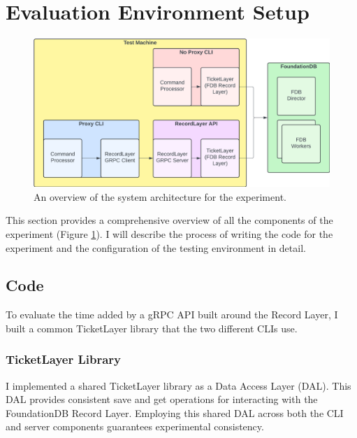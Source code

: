 \documentclass[sigconf]{acmart}
\begin{document}
\section{Evaluation Environment Setup}

\begin{figure}[t]
  \centering
  \includegraphics[width=\linewidth]{diag_system.png}
  \caption{An overview of the system architecture for the experiment.}
  \label{fig:diag_system}
\end{figure}

This section provides a comprehensive overview of all the components of the experiment (Figure \ref{fig:diag_system}). I will describe the process of writing the code for the experiment and the configuration of the testing environment in detail.

\subsection{Code}

To evaluate the time added by a gRPC API built around the Record Layer, I built a common TicketLayer library that the two different CLIs use.

\subsubsection{TicketLayer Library}

I implemented a shared TicketLayer library as a Data Access Layer (DAL). This DAL provides consistent save and get operations for interacting with the FoundationDB Record Layer. Employing this shared DAL across both the CLI and server components guarantees experimental consistency.
\end{document}
